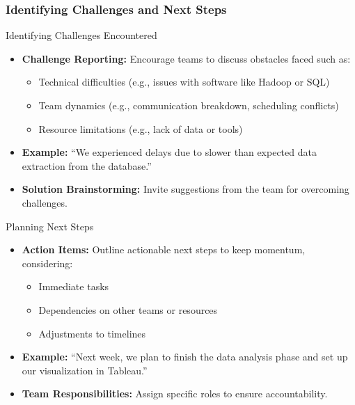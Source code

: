 \documentclass{beamer}
\begin{document}
\begin{frame}[fragile]
    \frametitle{Identifying Challenges and Next Steps}
    \begin{block}{Identifying Challenges Encountered}
        \begin{itemize}
            \item \textbf{Challenge Reporting:} Encourage teams to discuss obstacles faced such as:
            \begin{itemize}
                \item Technical difficulties (e.g., issues with software like Hadoop or SQL)
                \item Team dynamics (e.g., communication breakdown, scheduling conflicts)
                \item Resource limitations (e.g., lack of data or tools)
            \end{itemize}
            \item \textbf{Example:} ``We experienced delays due to slower than expected data extraction from the database.''
            \item \textbf{Solution Brainstorming:} Invite suggestions from the team for overcoming challenges.
        \end{itemize}
    \end{block}
    
    \begin{block}{Planning Next Steps}
        \begin{itemize}
            \item \textbf{Action Items:} Outline actionable next steps to keep momentum, considering:
            \begin{itemize}
                \item Immediate tasks
                \item Dependencies on other teams or resources
                \item Adjustments to timelines
            \end{itemize}
            \item \textbf{Example:} ``Next week, we plan to finish the data analysis phase and set up our visualization in Tableau.''
            \item \textbf{Team Responsibilities:} Assign specific roles to ensure accountability.
        \end{itemize}
    \end{block}
\end{frame}
\end{document}
